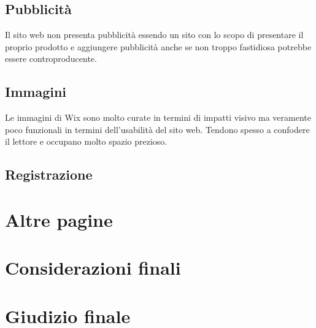 \documentclass[11pt,a4paper]{article}
\newcommand*{\wix}{Wix}
\begin{document}
\subsection{Pubblicità}
\label{subsec:ads}

Il sito web non presenta pubblicità essendo un sito con lo scopo di
presentare il proprio prodotto e aggiungere pubblicità anche se non
troppo fastidiosa potrebbe essere controproducente.

\subsection{Immagini}
\label{subsec:images}

Le immagini di \wix{} sono molto curate in termini di impatti visivo
ma veramente poco funzionali in termini dell'usabilità del sito
web. Tendono spesso a confodere il lettore e occupano molto spazio
prezioso.

\subsection{Registrazione}
\label{subsec:signup}

\section{Altre pagine}
\label{sec:other-pages}

\section{Considerazioni finali}
\label{sec:final-remarks}

\section{Giudizio finale}
\label{sec:final-vote}
\end{document}
